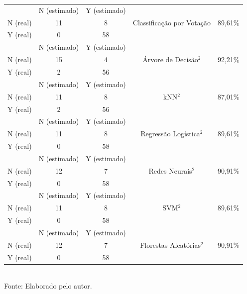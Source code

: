 \documentclass[a4paper,12pt]{article} %
\begin{document}
\begin{table}[H]
\begin{tabular}{ccc|c|c}
         & N (estimado) & Y (estimado) & \multirow{3}{*}{Classificação por Votação} & \multirow{3}{*}{89,61\%}\\
         N (real) & 11 & 8 &  & \\
         Y (real) & 0 & 58 &  & \\ \hline
         & N (estimado) & Y (estimado) & \multirow{3}{*}{Árvore de Decisão$^2$} & \multirow{3}{*}{92,21\%} \\
         N (real) & 15 & 4 &  & \\
         Y (real) & 2 & 56 &  & \\ \hline
         & N (estimado) & Y (estimado) & \multirow{3}{*}{kNN$^2$} & \multirow{3}{*}{87,01\%}\\
         N (real) & 11 & 8 &  & \\
         Y (real) & 2 & 56 &  & \\ \hline
         & N (estimado) & Y (estimado) & \multirow{3}{*}{Regressão Logística$^2$} & \multirow{3}{*}{89,61\%}\\
         N (real) & 11 & 8 &  & \\
         Y (real) & 0 & 58 &  & \\  \hline
         & N (estimado) & Y (estimado) & \multirow{3}{*}{Redes Neurais$^2$} & \multirow{3}{*}{90,91\%}\\
         N (real) & 12 & 7 &  & \\
         Y (real) & 0 & 58 &  & \\ \hline
         & N (estimado) & Y (estimado) & \multirow{3}{*}{SVM$^2$} & \multirow{3}{*}{89,61\%}\\
         N (real) & 11 & 8 &  & \\
         Y (real) & 0 & 58 &  & \\ \hline
         & N (estimado) & Y (estimado) & \multirow{3}{*}{Florestas Aleatórias$^2$} & \multirow{3}{*}{90,91\%}\\
         N (real) & 12 & 7 &  & \\
         Y (real) & 0 & 58 &  & \\ \hline\hline
    \end{tabular} \\
    \label{tab:6}
    Fonte: Elaborado pelo autor.
\end{table}
\end{document}

